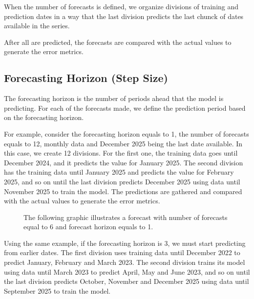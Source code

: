 \documentclass{article}
\numberwithin{equation}{section}
\begin{document}
When the number of forecasts is defined, we organize divisions of training and prediction dates in a way that the last division predicts the last chunck of dates available in the series.

After all are predicted, the forecasts are compared with the actual values to generate the error metrics.

\subsection{Forecasting Horizon (Step Size)}

The forecasting horizon is the number of periods ahead that the model is predicting. For each of the forecasts made, we define the prediction period based on the forecasting horizon.

For example, consider the forecasting horizon equals to 1, the number of forecasts equals to 12, monthly data and December 2025 being the last date available. In this case, we create 12 divisions. For the first one, the training data goes until December 2024, and it predicts the value for January 2025. The second division has the training data until January 2025 and predicts the value for February 2025, and so on until the last division predicts December 2025 using data until November 2025 to train the model. The predictions are gathered and compared with the actual values to generate the error metrics.

\begin{figure}[H]
The following graphic illustrates a forecast with number of forecasts equal to 6 and forecast horizon equals to 1.

    \begin{center}
    \end{center}
\end{figure}

Using the same example, if the forecasting horizon is 3, we must start predicting from earlier dates. The first division uses training data until December 2022 to predict January, February and March 2023. The second division trains its model using data until March 2023 to predict April, May and June 2023, and so on until the last division predicts October, November and December 2025 using data until September 2025 to train the model.
\end{document}
